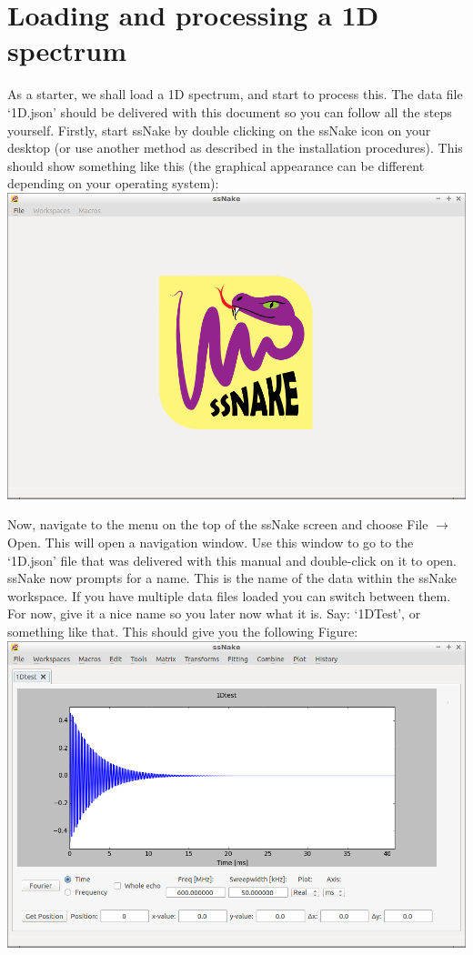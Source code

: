 \documentclass[11pt,a4paper]{article}
\begin{document}
\section{Loading and processing a 1D spectrum}
As a starter, we shall load a 1D spectrum, and start to process this. The data file `1D.json' should be delivered with this document so you can follow all the steps yourself. Firstly, start ssNake by double clicking on the ssNake icon on your desktop (or use another method as described in the installation procedures). This should show something like this (the graphical appearance can be different depending on your operating system):\\
\includegraphics[width=\linewidth]{Images/StartScreen.png}

Now, navigate to the menu on the top of the ssNake screen and choose File $\rightarrow$ Open. This will open a navigation window. Use this window to go to the `1D.json' file that was delivered with this manual and double-click on it to open. ssNake now prompts for a name. This is the name of the data within the ssNake workspace. If you have multiple data files loaded you can switch between them. For now, give it a nice name so you later now what it is. Say: `1DTest', or something like that. This should give you the following Figure:\\
\includegraphics[width=\linewidth]{Images/1Dfid.png}
\end{document}
